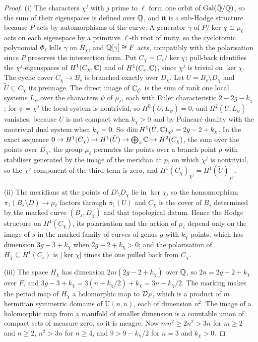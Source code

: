 \begin{proof}
(i) The characters $\chi^{j}$ with $j$ prime to $\ell$ form one orbit of
$\operatorname{Gal}(\bar{\mathbb{Q}}/\mathbb{Q})$, so the sum of their eigenspaces is defined over $\mathbb{Q}$,
and it is a sub-Hodge structure because $P$ acts by automorphisms of the
curve. A generator $\gamma$ of $P/\ker\chi\cong\mu_{\ell}$ acts on each
eigenspace by a primitive $\ell$-th root of unity, so the cyclotomic
polynomial $\Phi_{\ell}$ kills $\gamma$ on $H_{\chi}$, and $\mathbb{Q}[\gamma]\cong
F$ acts, compatibly with the polarisation since $P$ preserves the
intersection form. Put $C_{\chi}=C_{s}/\ker\chi$; pull-back identifies the
$\chi^{j}$-eigenspaces of $H^{1}(C_{\chi},\mathbb{C})$ and of $H^{1}(C_{s},\mathbb{C})$,
since $\chi^{j}$ is trivial on $\ker\chi$. The cyclic cover $C_{\chi}\to
B_{s}$ is branched exactly over $D_{\chi}$. Let $U=B_{s}\setminus D_{\chi}$
and $\tilde U\subseteq C_{\chi}$ its preimage. The direct image of
$\mathbb{C}_{\tilde U}$ is the sum of rank one local systems $L_{\psi}$ over the
characters $\psi$ of $\mu_{\ell}$, each with Euler characteristic
$2-2g-k_{\chi}$; for $\psi=\chi^{j}$ the local system is nontrivial, so
$H^{0}(U,L_{\psi})=0$, and $H^{2}(U,L_{\psi})$ vanishes, because $U$ is not
compact when $k_{\chi}>0$ and by Poincar\'e duality with the nontrivial dual
system when $k_{\chi}=0$. So $\dim H^{1}(\tilde U,\mathbb{C})_{\chi^{j}}=
2g-2+k_{\chi}$. In the exact sequence
$0\to H^{1}(C_{\chi})\to H^{1}(\tilde U)\to\bigoplus_{x}\mathbb{C}\to H^{2}(C_{\chi})$,
the sum over the points over $D_{\chi}$, the group $\mu_{\ell}$ permutes the
points over a branch point $p$ with stabiliser generated by the image of the
meridian at $p$, on which $\chi^{j}$ is nontrivial, so the
$\chi^{j}$-component of the third term is zero, and
$H^{1}(C_{\chi})_{\chi^{j}}=H^{1}(\tilde U)_{\chi^{j}}$.

(ii) The meridians at the points of $D\setminus D_{\chi}$ lie in $\ker\chi$,
so the homomorphism $\pi_{1}(B_{s}\setminus D)\to\mu_{\ell}$ factors through
$\pi_{1}(U)$ and $C_{\chi}$ is the cover of $B_{s}$ determined by the marked
curve $(B_{s},D_{\chi})$ and that topological datum. Hence the Hodge
structure on $H^{1}(C_{\chi})$, its polarisation and the action of $\mu_{\ell}$
depend only on the image of $s$ in the marked family of curves of genus $g$
with $k_{\chi}$ points, which has dimension $3g-3+k_{\chi}$ when
$2g-2+k_{\chi}>0$; and the polarisation of $H_{\chi}\subseteq H^{1}(C_{s})$
is $|\ker\chi|$ times the one pulled back from $C_{\chi}$.

(iii) The space $H_{\chi}$ has dimension $2m(2g-2+k_{\chi})$ over $\mathbb{Q}$, so
$2n=2g-2+k_{\chi}$ over $F$, and
$3g-3+k_{\chi}=3(n-k_{\chi}/2)+k_{\chi}=3n-k_{\chi}/2$. The marking makes the
period map of $H_{\chi}$ a holomorphic map to $\mathcal{D}_{F}$, which is a product
of $m$ hermitian symmetric domains of $\mathrm{U}(n,n)$, each of dimension
$n^{2}$. The image of a holomorphic map from a manifold of smaller dimension
is a countable union of compact sets of measure zero, so it is meagre. Now
$mn^{2}\ge2n^{2}>3n$ for $m\ge2$ and $n\ge2$, $n^{2}>3n$ for $n\ge4$, and
$9>9-k_{\chi}/2$ for $n=3$ and $k_{\chi}>0$.


\end{proof}
